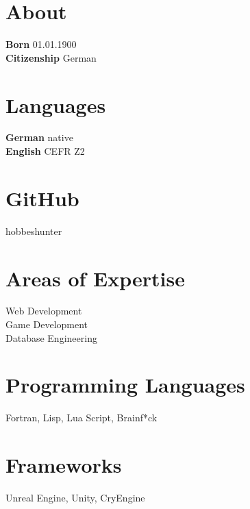 \documentclass[]{cv-style}%
\begin{document}
%
\header

\begin{aside}%
\section*{About}
\textbf{Born} 01.01.1900\\
\textbf{Citizenship} German

\section*{Languages}
\textbf{German} native\\
\textbf{English} CEFR Z2

\section*{GitHub}
hobbeshunter

\section*{Areas of Expertise}
Web Development\\
Game Development\\
Database Engineering\\


\section*{Programming Languages}
Fortran, Lisp, Lua Script, Brainf*ck

\section*{Frameworks}
Unreal Engine, Unity, CryEngine

\end{aside}%
\end{document}
